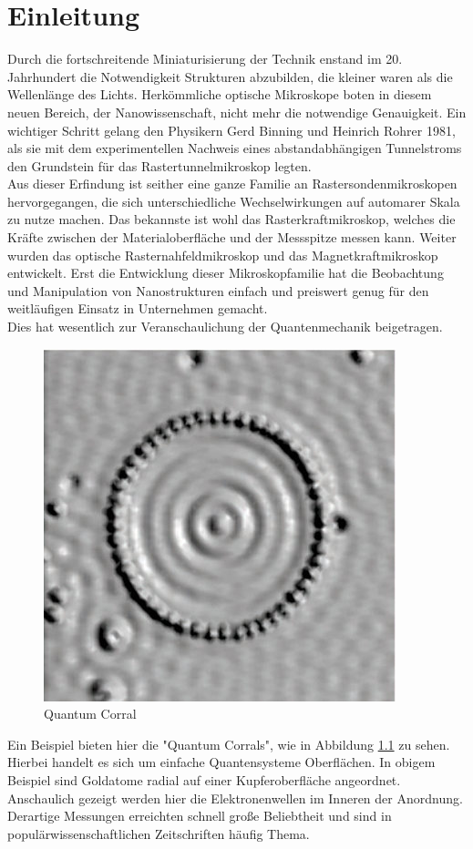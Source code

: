\chapter{Einleitung}

Durch die fortschreitende Miniaturisierung der Technik enstand im 20. Jahrhundert
die Notwendigkeit Strukturen abzubilden, die kleiner waren als die Wellenlänge des
Lichts. Herkömmliche optische Mikroskope boten in diesem neuen Bereich, der 
Nanowissenschaft, nicht mehr die notwendige Genauigkeit. Ein wichtiger Schritt
gelang den Physikern Gerd Binning und Heinrich Rohrer 1981, als sie mit dem 
experimentellen Nachweis eines abstandabhängigen Tunnelstroms den Grundstein für
das Rastertunnelmikroskop legten.\\
Aus dieser Erfindung ist seither eine ganze Familie an Rastersondenmikroskopen
hervorgegangen, die sich unterschiedliche Wechselwirkungen auf automarer Skala
zu nutze machen. Das bekannste ist wohl das Rasterkraftmikroskop, welches die 
Kräfte zwischen der Materialoberfläche und der Messspitze messen kann. Weiter
wurden das optische Rasternahfeldmikroskop und das Magnetkraftmikroskop entwickelt.
Erst die Entwicklung dieser Mikroskopfamilie hat die Beobachtung und Manipulation
von Nanostrukturen einfach und preiswert genug für den weitläufigen Einsatz in 
Unternehmen gemacht.\\
Dies hat wesentlich zur Veranschaulichung der Quantenmechanik beigetragen.
\begin{figure}
    \includegraphics[scale=1.25]{Abb/quant.jpg}
    \caption{Quantum Corral \cite{corral}}
    \label{qucorr}
\end{figure}
Ein Beispiel bieten hier die "Quantum Corrals", wie in Abbildung \ref{qucorr} zu
sehen. Hierbei handelt es sich um einfache Quantensysteme Oberflächen. In obigem
Beispiel sind Goldatome radial auf einer Kupferoberfläche angeordnet. Anschaulich
gezeigt werden hier die Elektronenwellen im Inneren der Anordnung.
Derartige Messungen erreichten schnell große Beliebtheit und sind in 
populärwissenschaftlichen Zeitschriften häufig Thema. 
\cite{rasterwiki}
% 
